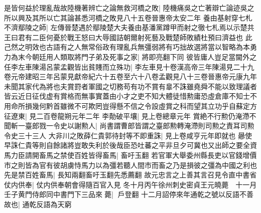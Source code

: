 是皆何益於理亂哉故陸機著辨亡之論無救河橋之敗|{
	陸機痛吳之亡著辯亡論迹吳之所以興及其所以亡其論甚悉河橋之敗見八十五卷晉惠帝太安二年}
養由基射穿七札不濟鄢陵之師|{
	左傳晉楚遇於鄢陵楚大夫養由基潘黨蹲甲而射之徹七札焉以示楚共王曰君有二臣何憂於戰王怒曰大辱國詰朝爾射死藝及戰楚師敗績杜預曰濟益也}
此己然之明效也古語有之人無常俗政有理亂兵無彊弱將有巧拙故選將當以智略為本勇力為末今朝廷用人類取將門子弟及死事之家|{
	將即亮翻下同}
彼皆庸人豈足當閫外之任李左車陳湯呂蒙孟觀皆出貧賤而立殊功|{
	李左車見十卷漢高帝三年陳湯見二十九卷元帝建昭三年呂蒙見獻帝紀六十五卷至六十八卷孟觀見八十三卷晉惠帝元康九年}
未聞其家代為將也夫賞罸者軍國之切務苟有功不賞有辠不誅雖堯舜不能以致理議者皆云近日征伐虚有賞格而無事實蓋由小才之吏不知大體徒惜勲庸恐虛倉庫不知士不用命所損幾何黔首雖微不可欺罔豈得懸不信之令設虛賞之科而望其立功乎自蘇定方征遼東|{
	見二百卷龍朔元年二年}
李勣破平壤|{
	見上卷總章元年}
賞絶不行勲仍淹滯不聞斬一臺郎戮一令史以謝勲人|{
	尚書謂曹郎皆謂之臺郎勲轉淹滯則司勲之責耳司勲令史三十三人}
大非川之敗薛仁貴郭待封等不即重誅|{
	見上卷咸亨元年即就也}
曏使早誅仁貴等則自餘諸將豈敢失利於後哉臣恐吐蕃之平非旦夕可冀也又出師之要全資馬力臣請開畜馬之禁使百姓皆得畜馬|{
	畜吁玉翻}
若官軍大舉委州縣長吏以官錢增價市之則皆為官有彼胡虜恃馬力以為彊若聽人間市而畜之乃是損彼之彊為中國之利也先是禁百姓畜馬|{
	長知兩翻畜吁玉翻先悉薦翻}
故元忠言之上善其言召見令直中書省仗内供奉|{
	仗内供奉朝會得隨百官入見}
冬十月丙午徐州刺史密貞王元曉薨　十一月壬子黄門侍郎同中書門下三品來薨|{
	戶登翻}
十二月詔停來年通乾之號以反語不善故也|{
	通乾反語為天窮}


